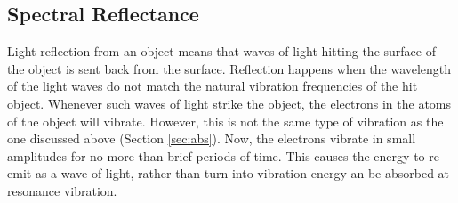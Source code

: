\subsection{Spectral Reflectance}\label{sec:specref}
Light reflection from an object means that waves of light hitting the surface of the object is sent back from the surface. Reflection happens when the wavelength of the light waves do not match the natural vibration frequencies of the hit object. Whenever such waves of light strike the object, the electrons in the atoms of the object will vibrate. However, this is not the same type of vibration as the one discussed above (Section \ref{sec:abs}). Now, the electrons vibrate in small amplitudes for no more than brief periods of time. This causes the energy to re-emit as a wave of light, rather than turn into vibration energy an be absorbed at resonance vibration. 
\\\\

